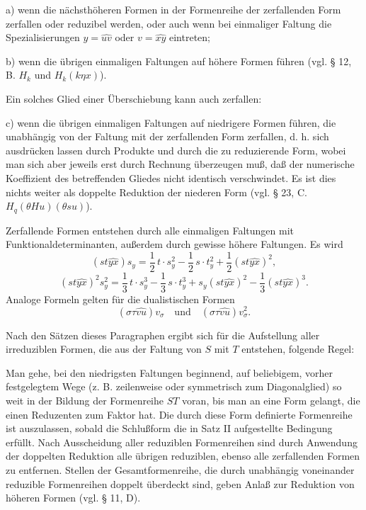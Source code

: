 a) wenn die nächsthöheren Formen in der Formenreihe der zerfallenden Form zerfallen oder reduzibel werden, oder auch wenn bei einmaliger Faltung die Spezialisierungen $y=\widehat{uv}$ oder $v=\widehat{xy}$ eintreten;

b) wenn die übrigen einmaligen Faltungen auf höhere Formen führen (vgl. § 12, B. $H_k$ und $H_k(k\eta x)$).

Ein solches Glied einer Überschiebung kann auch zerfallen:

c) wenn die übrigen einmaligen Faltungen auf niedrigere Formen führen, die unabhängig von der Faltung mit der zerfallenden Form zerfallen, d. h. sich ausdrücken lassen durch Produkte und durch die zu reduzierende Form, wobei man sich aber jeweils erst durch Rechnung überzeugen muß, daß der numerische Koeffizient des betreffenden Gliedes nicht identisch verschwindet. Es ist dies nichts weiter als \glqq{}doppelte Reduktion\grqq{} der niederen Form (vgl. § 23, C. $H_q(\theta H u)(\theta s u)$).

Zerfallende Formen entstehen durch alle einmaligen Faltungen mit Funktionaldeterminanten, außerdem durch gewisse höhere Faltungen. Es wird
\[
(st\widehat{yx})s_y=\frac12\,t\cdot s_y^2-\frac12\,s\cdot t_y^2+\frac12(st\widehat{yx})^2,
\]
\[
(st\widehat{yx})^2s_y^2=\frac13\,t\cdot s_y^3-\frac13\,s\cdot t_y^3+s_y(st\widehat{yx})^2-\frac13(st\widehat{yx})^3.
\]
Analoge Formeln gelten für die dualistischen Formen
\[
(\sigma\tau\widehat{vu})v_\sigma
\quad\text{und}\quad
(\sigma\tau\widehat{vu})v_\sigma^2.
\]

Nach den Sätzen dieses Paragraphen ergibt sich für die Aufstellung aller irreduziblen Formen, die aus der Faltung von $S$ mit $T$ entstehen, folgende Regel:

Man gehe, bei den niedrigsten Faltungen beginnend, auf beliebigem, vorher festgelegtem Wege (z. B. zeilenweise oder symmetrisch zum Diagonalglied) so weit in der Bildung der Formenreihe $ST$ voran, bis man an eine Form gelangt, die einen Reduzenten zum Faktor hat. Die durch diese Form definierte Formenreihe ist auszulassen, sobald die Schlußform die in Satz II aufgestellte Bedingung erfüllt. Nach Ausscheidung aller reduziblen Formenreihen sind durch Anwendung der doppelten Reduktion alle übrigen reduziblen, ebenso alle zerfallenden Formen zu entfernen. Stellen der Gesamtformenreihe, die durch unabhängig voneinander reduzible Formenreihen doppelt überdeckt sind, geben Anlaß zur Reduktion von höheren Formen (vgl. § 11, D).

